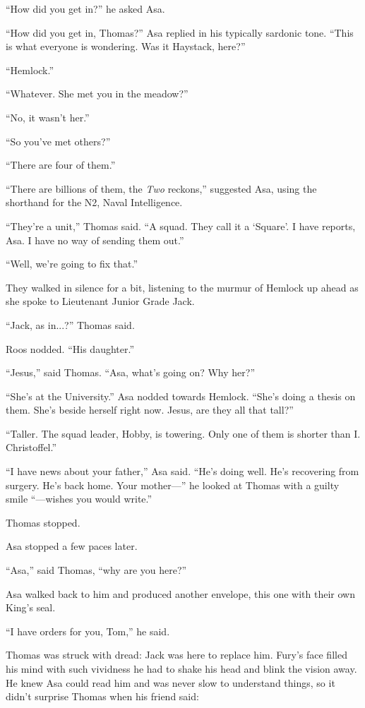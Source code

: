 \documentclass[11pt,a5paper]{article}
\begin{document}
``How did you get in?'' he asked Asa.

``How did you get in, Thomas?'' Asa replied in his typically sardonic tone. ``This is what everyone is wondering. Was it Haystack, here?''

``Hemlock.''

``Whatever. She met you in the meadow?''

``No, it wasn't her.''

``So you've met others?''

``There are four of them.''

``There are billions of them, the \emph{Two} reckons,'' suggested Asa, using the shorthand for the N2, Naval Intelligence.

``They're a unit,'' Thomas said. ``A squad. They call it a `Square'. I have reports, Asa. I have no way of sending them out.''

``Well, we're going to fix that.''

They walked in silence for a bit, listening to the murmur of Hemlock up ahead as she spoke to Lieutenant Junior Grade Jack.

``Jack, as in...?'' Thomas said.

Roos nodded. ``His daughter.''

``Jesus,'' said Thomas. ``Asa, what's going on? Why her?''

``She's at the University.'' Asa nodded towards Hemlock. ``She's doing a thesis on them. She's beside herself right now. Jesus, are they all that tall?''

``Taller. The squad leader, Hobby, is towering. Only one of them is shorter than I. Christoffel.''

``I have news about your father,'' Asa said. ``He's doing well. He's recovering from surgery. He's back home. Your mother---'' he looked at Thomas with a guilty smile ``---wishes you would write.''

Thomas stopped.

Asa stopped a few paces later.

``Asa,'' said Thomas, ``why are you here?''

Asa walked back to him and produced another envelope, this one with their own King's seal.

``I have orders for you, Tom,'' he said.

Thomas was struck with dread: Jack was here to replace him. Fury's face filled his mind with such vividness he had to shake his head and blink the vision away. He knew Asa could read him and was never slow to understand things, so it didn't surprise Thomas when his friend said:
\end{document}

